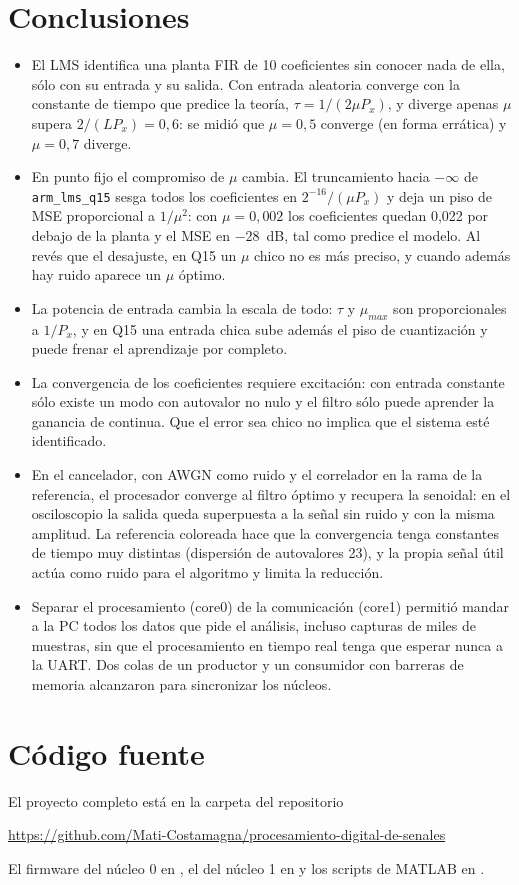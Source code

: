 \documentclass[11pt,a4paper]{article}
\newcommand{\Repo}{https://github.com/Mati-Costamagna/procesamiento-digital-de-senales}
\newcommand{\lmsq}{\texttt{arm\_lms\_q15}}
\begin{document}
\section{Conclusiones}
\begin{itemize}
  \item El LMS identifica una planta FIR de 10 coeficientes sin conocer nada de ella, sólo con su
  entrada y su salida. Con entrada aleatoria converge con la constante de tiempo que predice la
  teoría, $\tau = 1/(2\mu P_x)$, y diverge apenas $\mu$ supera $2/(LP_x) = 0{,}6$: se midió que
  $\mu = 0{,}5$ converge (en forma errática) y $\mu = 0{,}7$ diverge.
  \item En punto fijo el compromiso de $\mu$ cambia. El truncamiento hacia $-\infty$ de \lmsq{}
  sesga todos los coeficientes en $2^{-16}/(\mu P_x)$ y deja un piso de MSE proporcional a
  $1/\mu^2$: con $\mu = 0{,}002$ los coeficientes quedan 0,022 por debajo de la planta y el MSE en
  $-28$~dB, tal como predice el modelo. Al revés que el desajuste, en Q15 un $\mu$ chico no es más
  preciso, y cuando además hay ruido aparece un $\mu$ óptimo.
  \item La potencia de entrada cambia la escala de todo: $\tau$ y $\mu_{max}$ son
  proporcionales a $1/P_x$, y en Q15 una entrada chica sube además el piso de cuantización y puede
  frenar el aprendizaje por completo.
  \item La convergencia de los coeficientes requiere excitación: con entrada constante sólo
  existe un modo con autovalor no nulo y el filtro sólo puede aprender la ganancia de continua.
  Que el error sea chico no implica que el sistema esté identificado.
  \item En el cancelador, con AWGN como ruido y el correlador en la rama de la referencia, el
  procesador converge al filtro óptimo y recupera la senoidal: en el osciloscopio la salida
  queda superpuesta a la señal sin ruido y con la misma amplitud. La referencia coloreada hace
  que la convergencia tenga constantes de tiempo muy distintas (dispersión de autovalores 23), y
  la propia señal útil actúa como ruido para el algoritmo y limita la reducción.
  \item Separar el procesamiento (core0) de la comunicación (core1) permitió mandar a la PC
  todos los datos que pide el análisis, incluso capturas de miles de muestras, sin que el
  procesamiento en tiempo real tenga que esperar nunca a la UART. Dos colas de un productor y un
  consumidor con barreras de memoria alcanzaron para sincronizar los núcleos.
\end{itemize}

\clearpage
\appendix
\section{Código fuente}\label{sec:codigo}

El proyecto completo está en la carpeta  del repositorio
\begin{center}\url{\Repo}\end{center}
El firmware del núcleo 0 en , el del núcleo 1 en
 y los scripts de MATLAB en .
\end{document}
